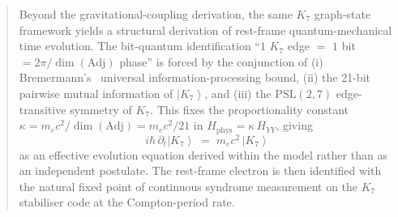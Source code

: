 \documentclass[11pt]{article}
\newcommand{\Adj}{\mathrm{Adj}}
\newcommand{\ket}[1]{\left|#1\right\rangle}
\newcommand{\PSL}{\mathrm{PSL}}
\begin{document}
\begin{abstract}
Beyond the gravitational-coupling derivation, the same $K_7$
graph-state framework yields a structural derivation of rest-frame
quantum-mechanical time evolution.  The bit-quantum identification
``$1$ $K_7$ edge $=$ $1$ bit $= 2\pi/\dim(\Adj)$ phase'' is forced by the
conjunction of (i) Bremermann's~\cite{bremermann1965} universal
information-processing
bound, (ii) the 21-bit pairwise mutual information of $\ket{K_7}$,
and (iii) the $\PSL(2,7)$ edge-transitive symmetry of $K_7$.  This
fixes the proportionality constant
$\kappa = m_e c^2/\dim(\Adj) = m_e c^2/21$ in $H_{\text{phys}} =
\kappa\, H_{YY}$, giving
\begin{equation}
  i\hbar\, \partial_t \ket{K_7} \;=\; m_e c^2\, \ket{K_7}
\end{equation}
as an effective evolution equation derived within the model rather
than as an independent postulate.  The rest-frame electron is then
identified with the natural fixed point of continuous syndrome
measurement on the $K_7$ stabiliser code at the Compton-period rate.


\end{abstract}
\end{document}
